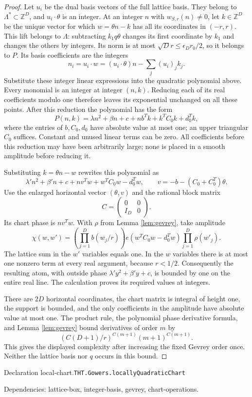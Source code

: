 \documentclass[11pt]{article}
\theoremstyle{definition}
\newcommand{\Z}{\mathbb Z}
\numberwithin{equation}{section}
\newcommand{\bp}[3]{\par\smallskip\begingroup\footnotesize
\noindent\hypertarget{bp:#1}{\textsf{Declaration #1.}}\quad\nolinkurl{#2}\par
\noindent\textsf{Dependencies:} #3.\par\endgroup\smallskip}
\begin{document}
\begin{proof}
Let $u_i$ be the dual basis vectors of the full lattice basis. They belong to $\Lambda^*\subset\Z^D$, and $u_i\cdot\theta$ is an integer. At an integer $n$ with $w_{S,r}(n)\ne0$, let $k\in\Z^D$ be the unique vector for which $w=\theta n-k$ has all its coordinates in $(-r,r)$. This lift belongs to $\Lambda$: subtracting $k_1q\theta$ changes its first coordinate by $k_1$ and changes the others by integers. Its norm is at most $\sqrt D r\le\epsilon_Dr_0/2$, so it belongs to $P$. Its basis coefficients are the integers
\[
 n_i=u_i\cdot w=(u_i\cdot\theta)n-\sum_j(u_i)_j k_j.
\]
Substitute these integer linear expressions into the quadratic polynomial above. Every monomial is an integer at integer $(n,k)$. Reducing each of its real coefficients modulo one therefore leaves its exponential unchanged on all these points. After this reduction the polynomial has the form
\[
 P(n,k)=\lambda n^2+\beta n+c+n b^Tk+k^TC_0k+d_0^Tk,
\]
where the entries of $b,C_0,d_0$ have absolute value at most one; an upper triangular $C_0$ suffices. Constant and unused linear terms can be zero. All coefficients before this reduction may have been arbitrarily large; none is placed in a smooth amplitude before reducing it.

Substituting $k=\theta n-w$ rewrites this polynomial as
\[
 \lambda' n^2+\beta'n+c+n v^Tw+w^TC_0w-d_0^Tw,
 \qquad v=-b-(C_0+C_0^T)\theta.
\]
Use the enlarged horizontal vector $(\theta,v)$ and the rational block matrix
\[
 C=\begin{pmatrix}0&0\\ I_D&0\end{pmatrix}.
\]
Its chart phase is $n v^Tw$. With $\rho$ from Lemma \ref{lem:gevrey}, take amplitude
\[
 \chi(w,w')=\left(\prod_{j=1}^D b(w_j/r)\right)
 e(w^TC_0w-d_0^Tw)\prod_{j=1}^D\rho(w'_j).
\]
The lattice sum in the $w'$ variables equals one. In the $w$ variables there is at most one nonzero term at every real argument, because $r<1/2$. Consequently the resulting atom, with outside phase $\lambda'y^2+\beta'y+c$, is bounded by one on the entire real line. The calculation proves its required values at integers.

There are $2D$ horizontal coordinates, the chart matrix is integral of height one, the support is bounded, and the only coefficients in the amplitude have absolute value at most one. The product rule, the polynomial phase derivative formula, and Lemma \ref{lem:gevrey} bound derivatives of order $m$ by
\[
 (C(D+1)/r)^{C(m+1)}(m+1)^{C(m+1)}.
\]
This gives the displayed complexity after increasing the fixed Gevrey order once. Neither the lattice basis nor $q$ occurs in this bound.
\end{proof}
\bp{local-chart}{THT.Gowers.locallyQuadraticChart}{lattice-box, integer-basis, gevrey, chart-operations}
\end{document}
